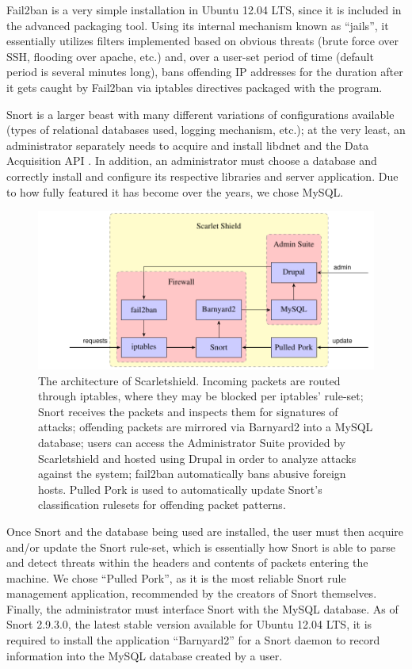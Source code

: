 \documentclass[11.5pt,letterpaper,titlepage]{report}
\begin{document}
Fail2ban is a very simple installation in Ubuntu 12.04 LTS, since it is included
in the advanced packaging tool.  Using its internal mechanism known as ``jails'',
it essentially utilizes filters implemented based on obvious threats (brute
force over SSH, flooding over apache, etc.) and, over a user-set period of time
(default period is several minutes long), bans offending IP addresses for the
duration after it gets caught by Fail2ban via iptables directives packaged with
the program.

Snort is a larger beast with many different variations of configurations
available (types of relational databases used, logging mechanism, etc.); at the
very least, an administrator separately needs to acquire and install libdnet and
the Data Acquisition API \autocite{snort}.  In addition, an administrator must choose a
database and correctly install and configure its respective libraries and server
application.  Due to how fully featured it has become over the years, we chose
MySQL.

\begin{figure}[h]
\centering
  \includegraphics{./scarlet-shield-diagram2.pdf}
  \caption{The architecture of Scarletshield. Incoming packets are routed
  through iptables, where they may be blocked per iptables' rule-set; Snort receives
  the packets and inspects them for signatures of attacks; offending packets are 
  mirrored via Barnyard2 into a MySQL database; users can access the Administrator
  Suite provided by Scarletshield and hosted using Drupal in order to analyze
  attacks against the system; fail2ban automatically bans abusive foreign hosts. 
  Pulled Pork is used to automatically update Snort's classification rulesets
  for offending packet patterns.}
\end{figure}

Once Snort and the database being used are installed, the user must then acquire
and/or update the Snort rule-set, which is essentially how Snort is able to parse
and detect threats within the headers and contents of packets entering the
machine.  We chose ``Pulled Pork'', as it is the most reliable Snort rule management
application, recommended by the creators of Snort themselves.  Finally, the
administrator must interface Snort with the MySQL database.  As of Snort
2.9.3.0, the latest stable version available for Ubuntu 12.04 LTS, it is
required to install the application ``Barnyard2'' for a Snort daemon to record
information into the MySQL database created by a user.
\end{document}
